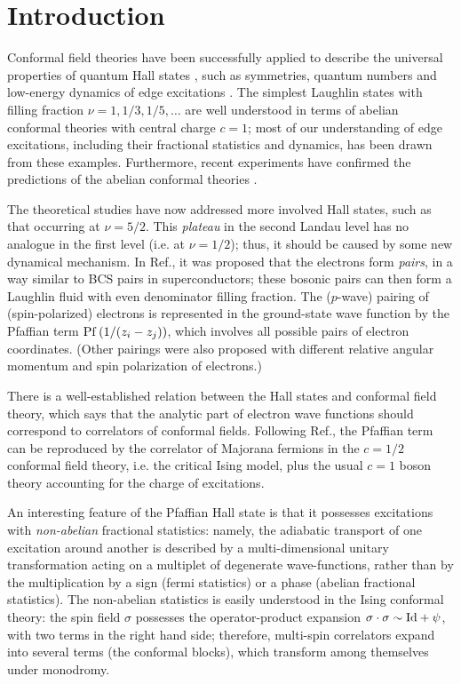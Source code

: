 \documentclass[a4paper,12pt]{article}
\begin{document}

\section{Introduction}

Conformal field theories have been successfully applied to
describe the universal properties of quantum Hall states \cite{prange},
such as symmetries, quantum numbers and low-energy dynamics of 
edge excitations  \cite{wen}.
The simplest Laughlin states with filling fraction $\nu=1,1/3,1/5,\dots$
are well understood in terms of  abelian conformal theories
with central charge $c=1$; most of our understanding
of edge excitations, including their fractional statistics
 and dynamics, has been drawn from these examples.
Furthermore, recent experiments have confirmed 
the predictions of the abelian conformal theories \cite{expe}.

The theoretical studies have now addressed more involved
Hall states, such as that occurring at $\nu=5/2$. 
This {\it plateau} in the second Landau level has no analogue in
the first level (i.e. at $\nu=1/2$); thus, it should be
caused by some new dynamical mechanism.
In Ref.\cite{pfaf}, it was proposed that the electrons form {\it pairs},
in a way similar to BCS pairs in superconductors;
these bosonic pairs can then form a
Laughlin fluid with even denominator filling fraction.
The ($p$-wave) pairing of (spin-polarized) electrons 
is represented in the ground-state wave function 
by the Pfaffian term ${\rm Pf}\left( 1/(z_i -z_j )\right)$,
which involves all possible pairs of electron coordinates.
(Other pairings were also proposed with different relative
angular momentum and spin polarization of electrons.)

There is a well-established relation between the Hall
states and conformal field theory, which says that
the analytic part of electron wave functions should correspond to
correlators of conformal fields.
Following Ref.\cite{pfaf}, the Pfaffian term can be reproduced by
the correlator of Majorana fermions in the $c=1/2$ conformal field theory,
i.e. the critical Ising model,
plus the usual $c=1$ boson theory accounting for the charge of excitations.

An interesting feature of the Pfaffian Hall state is that it possesses
excitations with {\it non-abelian} fractional statistics:
namely, the adiabatic transport of one excitation
around another is described by a multi-dimensional unitary
transformation acting on a multiplet of degenerate wave-functions,
rather than by the multiplication by a sign  (fermi statistics)
or a phase (abelian fractional statistics).
The non-abelian statistics is easily understood in the Ising conformal theory:
the spin field $\sigma$ possesses the operator-product expansion
$\sigma \cdot \sigma \sim {\rm Id} + \psi$, with two terms in the
right hand side; therefore, multi-spin correlators expand into several
terms (the conformal blocks), which transform among themselves
under monodromy.
\end{document}
